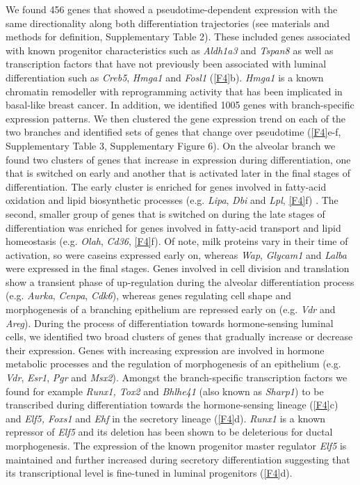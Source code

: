 \documentclass[titlepage, 12pt, oneside]{amsart}
\begin{document}
We found 456 genes that showed a pseudotime-dependent expression with the same directionality along both differentiation trajectories (see materials and methods for definition, Supplementary Table 2).
These included genes associated with known progenitor characteristics such as \textit{Aldh1a3} and \textit{Tspan8} as well as transcription factors that have not previously been associated with luminal differentiation such as \textit{Creb5}, \textit{Hmga1} and \textit{Fosl1} (\autoref{F4}b).
\textit{Hmga1} is a known chromatin remodeller with reprogramming activity that has been implicated in basal-like breast cancer\autocite{Shah2012,Shah2013}.
In addition, we identified 1005 genes with branch-specific expression patterns.
We then clustered the gene expression trend on each of the two branches and identified sets of genes that change over pseudotime (\autoref{F4}e-f, Supplementary Table 3, Supplementary Figure 6).
On the alveolar branch we found two clusters of genes that increase in expression during differentiation, one that is switched on early and another that is activated later in the final stages of differentiation.
The early cluster is enriched for genes involved in fatty-acid oxidation and lipid biosynthetic processes (e.g. \textit{Lipa}, \textit{Dbi} and \textit{Lpl}, \autoref{F4}f) .
The second, smaller group of genes that is switched on during the late stages of differentiation was enriched for genes involved in fatty-acid transport and lipid homeostasis (e.g. \textit{Olah}, \textit{Cd36}, \autoref{F4}f).
Of note, milk proteins vary in their time of activation, so were caseins expressed early on, whereas \textit{Wap}, \textit{Glycam1} and \textit{Lalba} were expressed in the final stages.
Genes involved in cell division and translation show a transient phase of up-regulation during the alveolar differentiation process (e.g. \textit{Aurka}, \textit{Cenpa}, \textit{Cdk6}), whereas genes regulating cell shape and morphogenesis of a branching epithelium are repressed early on (e.g. \textit{Vdr} and \textit{Areg}).
During the process of differentiation towards hormone-sensing luminal cells, we identified two broad clusters of genes that gradually increase or decrease their expression.
Genes with increasing expression are involved in hormone metabolic processes and the regulation of morphogenesis of an epithelium (e.g. \textit{Vdr}, \textit{Esr1}, \textit{Pgr} and \textit{Msx2}).
Amongst the branch-specific transcription factors we found for example \textit{Runx1, Tox2} and \textit{Bhlhe41} (also known as \textit{Sharp1}) to be transcribed during differentiation towards the hormone-sensing lineage (\autoref{F4}c) and \textit{Elf5, Foxs1} and \textit{Ehf} in the secretory lineage (\autoref{F4}d).
\textit{Runx1} is a known repressor of \textit{Elf5} and its deletion has been shown to be deleterious for ductal morphogenesis\autocite{VanBragt2014}.
The expression of the known progenitor master regulator \textit{Elf5} is maintained and further increased during secretory differentiation suggesting that its transcriptional level is fine-tuned in luminal progenitors (\autoref{F4}d).
\end{document}
